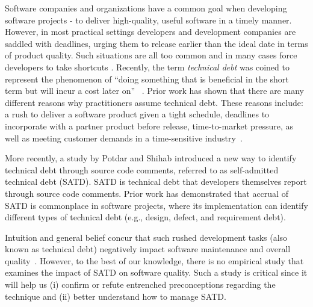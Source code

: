 Software companies and organizations have a common goal when developing software projects - to deliver high-quality, useful software in a timely manner. However, in most practical settings developers and development companies are saddled with deadlines, urging them to release earlier than the ideal date in terms of product quality. Such situations are all too common and in many cases force developers to take shortcuts \cite{kruchten2013technical} \cite{seaman2015technical}. Recently, the term \emph{technical debt} was coined to represent the phenomenon of ``doing something that is beneficial in the short term but will incur a cost later on''~ \cite{cunningham1993wycash}. Prior work has shown that there are many different reasons why practitioners assume technical debt. These reasons include: a rush to deliver a software product given a tight schedule, deadlines to incorporate with a partner product before release, time-to-market pressure, as well as meeting customer demands in a time-sensitive industry~\cite{lim2012balancing}.


More recently, a study by Potdar and Shihab \cite{ICSM_PotdarS14} introduced a new way to identify technical debt through source code comments, referred to as self-admitted technical debt (SATD). SATD is technical debt that developers themselves report through source code comments. Prior work \cite{MTD15p9} has demonstrated that accrual of SATD is commonplace in software projects, where its implementation can identify different types of technical debt (e.g., design, defect, and requirement debt).

Intuition and general belief concur that such rushed development tasks (also known as technical debt) negatively impact software maintenance and overall quality~\cite{zazworka2011investigating,spinola2013investigating,GuoSGCTSSS11,seaman2015technical,kruchten2013technical}. However, to the best of our knowledge, there is no empirical study that examines the impact of SATD on software quality. Such a study is critical since it will help us (i) confirm or refute entrenched preconceptions regarding the technique and (ii) better understand how to manage SATD.

